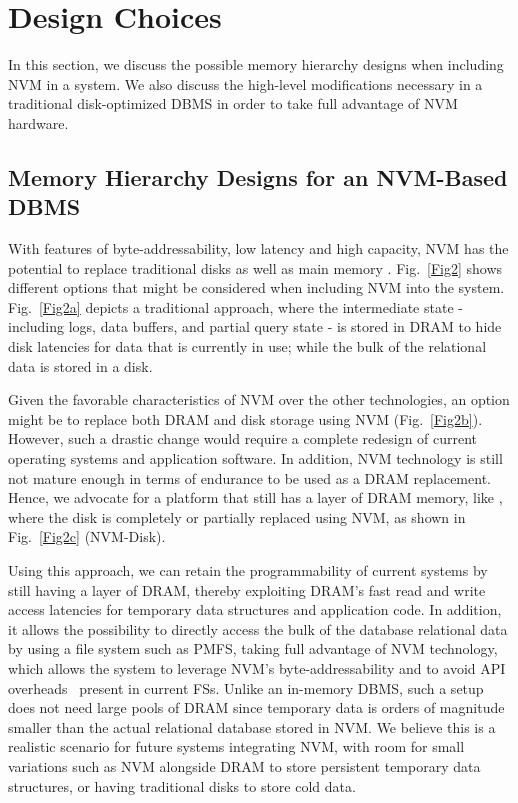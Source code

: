 \section{Design Choices}
\label{sec:Implications}
\noindent In this section, we discuss the possible memory hierarchy designs when including NVM in a system. We also discuss the high-level modifications necessary in a traditional disk-optimized DBMS in order to take full advantage of NVM hardware.
\subsection{Memory Hierarchy Designs for an NVM-Based DBMS}

With features of byte-addressability, low latency and high capacity, NVM has the potential to replace traditional disks as well as main memory \cite{chang2012limits}. Fig.~\ref{Fig2} shows different options that might be considered when including NVM into the system. Fig.~\ref{Fig2a} depicts a traditional approach, where the intermediate state - including logs, data buffers, and partial query state - is stored in DRAM to hide disk latencies for data that is currently in use; while the bulk of the relational data is stored in a  disk.

Given the favorable characteristics of NVM over the other technologies, an option might be to replace both DRAM and disk storage 
using NVM (Fig.~\ref{Fig2b}). However, such a drastic change would require a complete redesign of current operating systems and 
application software. In addition, NVM technology is still not mature enough in terms of endurance to be used as a DRAM replacement. 
Hence, we advocate for a platform that still has a layer of DRAM memory, like \cite{kimura2015foedus}, where the disk is completely or partially replaced using NVM, 
as shown in Fig.~\ref{Fig2c} (NVM-Disk).

Using this approach, we can retain the programmability of current systems by still having a layer of DRAM, thereby exploiting DRAM's fast read and write access latencies for temporary data structures and application code. In addition, it allows the possibility to directly access the bulk of the database relational data by using a file system such as PMFS, taking full advantage of NVM technology, which allows the system to leverage NVM's byte-addressability and to avoid API overheads~\cite{huang2014nvram} present in current FSs. Unlike an in-memory DBMS, such a setup does not need large pools of DRAM since temporary data is orders of magnitude smaller than the actual relational database stored in NVM. We believe this is a realistic scenario for future systems integrating NVM, with room for small variations such as NVM alongside DRAM to store persistent temporary data structures, or having traditional disks to store cold data.

